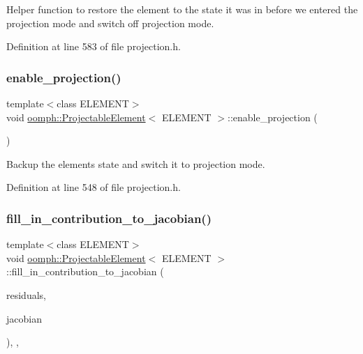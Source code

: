 Helper function to restore the element to the state it was in before we entered the projection mode and switch off projection mode. 



Definition at line 583 of file projection.\+h.

\mbox{\label{classoomph_1_1ProjectableElement_a08968691986cf6dbe45e5c20d46e46be}} 
\subsubsection{\texorpdfstring{enable\+\_\+projection()}{enable\_projection()}}
{\footnotesize\ttfamily template$<$class E\+L\+E\+M\+E\+NT$>$ \\
void \hyperlink{classoomph_1_1ProjectableElement}{oomph\+::\+Projectable\+Element}$<$ E\+L\+E\+M\+E\+NT $>$\+::enable\+\_\+projection (\begin{DoxyParamCaption}{ }\end{DoxyParamCaption})\hspace{0.3cm}{\ttfamily [inline]}}



Backup the element\textquotesingle{}s state and switch it to projection mode. 



Definition at line 548 of file projection.\+h.

\mbox{\label{classoomph_1_1ProjectableElement_a5b6894eda403bd2b9d2cf1e0314d7a23}} 
\subsubsection{\texorpdfstring{fill\+\_\+in\+\_\+contribution\+\_\+to\+\_\+jacobian()}{fill\_in\_contribution\_to\_jacobian()}}
{\footnotesize\ttfamily template$<$class E\+L\+E\+M\+E\+NT$>$ \\
void \hyperlink{classoomph_1_1ProjectableElement}{oomph\+::\+Projectable\+Element}$<$ E\+L\+E\+M\+E\+NT $>$\+::fill\+\_\+in\+\_\+contribution\+\_\+to\+\_\+jacobian (\begin{DoxyParamCaption}\item[{\hyperlink{classoomph_1_1Vector}{Vector}$<$ double $>$ \&}]{residuals,  }\item[{\hyperlink{classoomph_1_1DenseMatrix}{Dense\+Matrix}$<$ double $>$ \&}]{jacobian }\end{DoxyParamCaption})\hspace{0.3cm}{\ttfamily [inline]}, {\ttfamily [protected]}, {\ttfamily [virtual]}}



